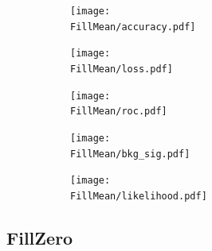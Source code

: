 \documentclass[../../main/main.tex]{subfiles}
\begin{document}


\begin{figure}[H]
  \centering
  \begin{subfigure}[t]{0.5\textwidth}
    \centering
    \texttt{[image: \\FillMean/accuracy.pdf]}
    \caption{\captionAcc}
    \label{fig:FillMean_acc}
  \end{subfigure}
  \vspace{0.01cm}
  \begin{subfigure}[t]{0.5\textwidth}
    \centering
    \texttt{[image: \\FillMean/loss.pdf]}
    \caption{\captionLoss}
    \label{fig:FillMean_loss}
  \end{subfigure}
  \begin{subfigure}[t]{0.5\textwidth}
    \centering
    \texttt{[image: \\FillMean/roc.pdf]}
    \caption{\captionROC}
    \label{fig:FillMean_roc}
  \end{subfigure}
  \caption{}
  \label{fig:FillMean_1}  
\end{figure}

\begin{figure}[H]
  \centering
  \begin{subfigure}[t]{0.5\textwidth}
    \centering
    \texttt{[image: \\FillMean/bkg\_sig.pdf]}
    \caption{\captionBkgSig}    
    \label{fig:FillMean_bkg_sig}
  \end{subfigure}
  \vspace{0.01cm}
  \begin{subfigure}[t]{0.5\textwidth}
    \centering
    \texttt{[image: \\FillMean/likelihood.pdf]}
    \caption{\captionLik}    
    \caption{}
    \label{fig:FillMean_likelihood}
  \end{subfigure}
  \caption{}
  \label{fig:FillMean_Z}
\end{figure}

\subsection{FillZero}
\label{sec:fillzero}
\end{document}
